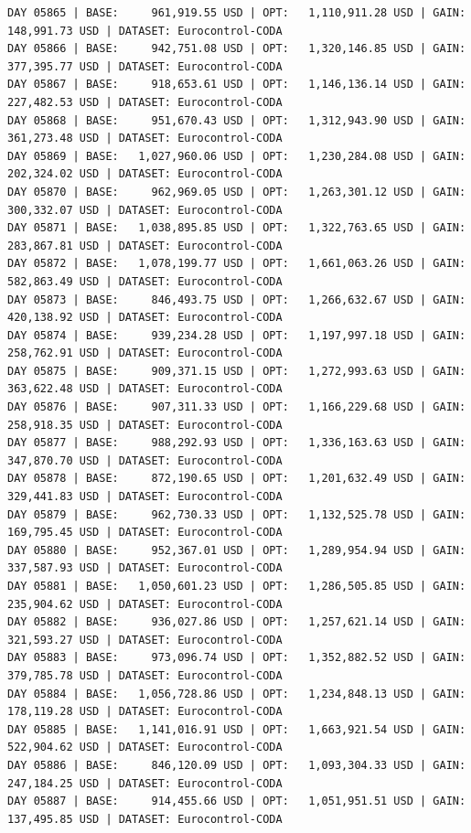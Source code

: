 \documentclass[11pt,a4paper]{article}
\begin{document}
\begin{verbatim}
DAY 05865 | BASE:     961,919.55 USD | OPT:   1,110,911.28 USD | GAIN: 148,991.73 USD | DATASET: Eurocontrol-CODA
DAY 05866 | BASE:     942,751.08 USD | OPT:   1,320,146.85 USD | GAIN: 377,395.77 USD | DATASET: Eurocontrol-CODA
DAY 05867 | BASE:     918,653.61 USD | OPT:   1,146,136.14 USD | GAIN: 227,482.53 USD | DATASET: Eurocontrol-CODA
DAY 05868 | BASE:     951,670.43 USD | OPT:   1,312,943.90 USD | GAIN: 361,273.48 USD | DATASET: Eurocontrol-CODA
DAY 05869 | BASE:   1,027,960.06 USD | OPT:   1,230,284.08 USD | GAIN: 202,324.02 USD | DATASET: Eurocontrol-CODA
DAY 05870 | BASE:     962,969.05 USD | OPT:   1,263,301.12 USD | GAIN: 300,332.07 USD | DATASET: Eurocontrol-CODA
DAY 05871 | BASE:   1,038,895.85 USD | OPT:   1,322,763.65 USD | GAIN: 283,867.81 USD | DATASET: Eurocontrol-CODA
DAY 05872 | BASE:   1,078,199.77 USD | OPT:   1,661,063.26 USD | GAIN: 582,863.49 USD | DATASET: Eurocontrol-CODA
DAY 05873 | BASE:     846,493.75 USD | OPT:   1,266,632.67 USD | GAIN: 420,138.92 USD | DATASET: Eurocontrol-CODA
DAY 05874 | BASE:     939,234.28 USD | OPT:   1,197,997.18 USD | GAIN: 258,762.91 USD | DATASET: Eurocontrol-CODA
DAY 05875 | BASE:     909,371.15 USD | OPT:   1,272,993.63 USD | GAIN: 363,622.48 USD | DATASET: Eurocontrol-CODA
DAY 05876 | BASE:     907,311.33 USD | OPT:   1,166,229.68 USD | GAIN: 258,918.35 USD | DATASET: Eurocontrol-CODA
DAY 05877 | BASE:     988,292.93 USD | OPT:   1,336,163.63 USD | GAIN: 347,870.70 USD | DATASET: Eurocontrol-CODA
DAY 05878 | BASE:     872,190.65 USD | OPT:   1,201,632.49 USD | GAIN: 329,441.83 USD | DATASET: Eurocontrol-CODA
DAY 05879 | BASE:     962,730.33 USD | OPT:   1,132,525.78 USD | GAIN: 169,795.45 USD | DATASET: Eurocontrol-CODA
DAY 05880 | BASE:     952,367.01 USD | OPT:   1,289,954.94 USD | GAIN: 337,587.93 USD | DATASET: Eurocontrol-CODA
DAY 05881 | BASE:   1,050,601.23 USD | OPT:   1,286,505.85 USD | GAIN: 235,904.62 USD | DATASET: Eurocontrol-CODA
DAY 05882 | BASE:     936,027.86 USD | OPT:   1,257,621.14 USD | GAIN: 321,593.27 USD | DATASET: Eurocontrol-CODA
DAY 05883 | BASE:     973,096.74 USD | OPT:   1,352,882.52 USD | GAIN: 379,785.78 USD | DATASET: Eurocontrol-CODA
DAY 05884 | BASE:   1,056,728.86 USD | OPT:   1,234,848.13 USD | GAIN: 178,119.28 USD | DATASET: Eurocontrol-CODA
DAY 05885 | BASE:   1,141,016.91 USD | OPT:   1,663,921.54 USD | GAIN: 522,904.62 USD | DATASET: Eurocontrol-CODA
DAY 05886 | BASE:     846,120.09 USD | OPT:   1,093,304.33 USD | GAIN: 247,184.25 USD | DATASET: Eurocontrol-CODA
DAY 05887 | BASE:     914,455.66 USD | OPT:   1,051,951.51 USD | GAIN: 137,495.85 USD | DATASET: Eurocontrol-CODA

\end{verbatim}
\end{document}
